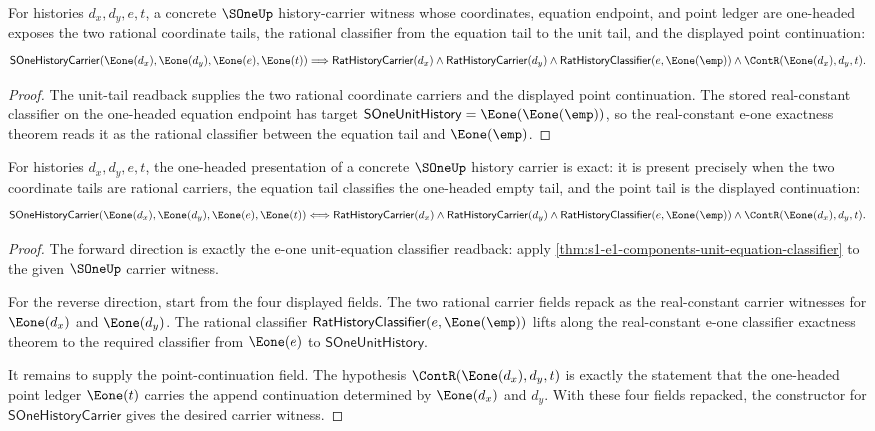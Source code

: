 \begin{theorem}
\label{thm:s1-e1-components-unit-equation-classifier}
For histories $d_x,d_y,e,t$, a concrete $\SOneUp$ history-carrier witness whose
coordinates, equation endpoint, and point ledger are one-headed exposes the two
rational coordinate tails, the rational classifier from the equation tail to the
unit tail, and the displayed point continuation:
$$
\mathsf{SOneHistoryCarrier}(\Eone(d_x),\Eone(d_y),\Eone(e),\Eone(t))
\Longrightarrow
\mathsf{RatHistoryCarrier}(d_x)\land
\mathsf{RatHistoryCarrier}(d_y)\land
\mathsf{RatHistoryClassifier}(e,\Eone(\emp))\land
\ContR(\Eone(d_x),d_y,t).
$$
\end{theorem}
\begin{proof}
The unit-tail readback supplies the two rational coordinate carriers and the
displayed point continuation. The stored real-constant classifier on the
one-headed equation endpoint has target $\mathsf{SOneUnitHistory}=\Eone(\Eone(\emp))$,
so the real-constant e-one exactness theorem reads it as the rational classifier
between the equation tail and $\Eone(\emp)$.
\end{proof}

\begin{theorem}
\label{thm:sone-e1-components-carrier-exactness}
For histories $d_x,d_y,e,t$, the one-headed presentation of a concrete
$\SOneUp$ history carrier is exact: it is present precisely when the two
coordinate tails are rational carriers, the equation tail classifies the
one-headed empty tail, and the point tail is the displayed continuation:
$$
\mathsf{SOneHistoryCarrier}(\Eone(d_x),\Eone(d_y),\Eone(e),\Eone(t))
\Longleftrightarrow
\mathsf{RatHistoryCarrier}(d_x)\land
\mathsf{RatHistoryCarrier}(d_y)\land
\mathsf{RatHistoryClassifier}(e,\Eone(\emp))\land
\ContR(\Eone(d_x),d_y,t).
$$
\end{theorem}
\begin{proof}
The forward direction is exactly the e-one unit-equation classifier readback:
apply \autoref{thm:s1-e1-components-unit-equation-classifier} to the given
$\SOneUp$ carrier witness.

For the reverse direction, start from the four displayed fields. The two
rational carrier fields repack as the real-constant carrier witnesses for
$\Eone(d_x)$ and $\Eone(d_y)$. The rational classifier
$\mathsf{RatHistoryClassifier}(e,\Eone(\emp))$ lifts along the real-constant
e-one classifier exactness theorem to the required classifier from
$\Eone(e)$ to $\mathsf{SOneUnitHistory}$.

It remains to supply the point-continuation field. The hypothesis
$\ContR(\Eone(d_x),d_y,t)$ is exactly the statement that the one-headed point
ledger $\Eone(t)$ carries the append continuation determined by
$\Eone(d_x)$ and $d_y$. With these four fields repacked, the constructor for
$\mathsf{SOneHistoryCarrier}$ gives the desired carrier witness.
\end{proof}

